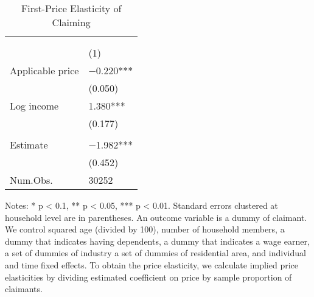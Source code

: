 \begin{table}

\caption{First-Price Elasticity of Claiming\label{tab:claim-elasticity}}
\centering
\fontsize{8}{10}\selectfont
\begin{threeparttable}
\begin{tabular}[t]{>{\raggedright\arraybackslash}p{25em}>{\centering\arraybackslash}p{15em}}
\toprule
\multicolumn{1}{c}{ } & \multicolumn{1}{c}{1 = Claiming} \\
\cmidrule(l{3pt}r{3pt}){2-2}
\multicolumn{1}{c}{ } & \multicolumn{1}{c}{FE} \\
\cmidrule(l{3pt}r{3pt}){2-2}
  & (1)\\
\midrule
Applicable price & \num{-0.220}***\\
 & (\num{0.050})\\
Log income & \num{1.380}***\\
 & (\num{0.177})\\
\midrule
\addlinespace[0.3em]
\multicolumn{2}{l}{\textit{Implied price elasticity}}\\
\hspace{1em}Estimate & \num{-1.982}***\\
\hspace{1em} & (\num{0.452})\\
Num.Obs. & \num{30252}\\
\bottomrule
\end{tabular}
\begin{tablenotes}
\item Notes: * p < 0.1, ** p < 0.05, *** p < 0.01. Standard errors clustered at household level are in parentheses. An outcome variable is a dummy of claimant. We control squared age (divided by 100), number of household members, a dummy that indicates having dependents, a dummy that indicates a wage earner, a set of dummies of industry a set of dummies of residential area, and individual and time fixed effects.  To obtain the price elasticity, we calculate implied price elasticities by dividing estimated coefficient on price by sample proportion of claimants.
\end{tablenotes}
\end{threeparttable}
\end{table}
